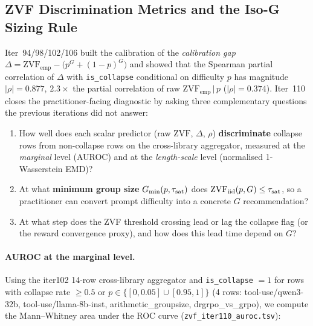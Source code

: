 
\subsection{ZVF Discrimination Metrics and the Iso-G Sizing Rule}
\label{sec:zvf-discrim}

Iter~94/98/102/106 built the calibration of the \emph{calibration gap}
$\Delta = \mathrm{ZVF}_{\mathrm{emp}} -
\bigl(p^{G}+(1-p)^{G}\bigr)$ and showed that the Spearman partial
correlation of $\Delta$ with \texttt{is\_collapse} conditional on
difficulty $p$ has magnitude $|\rho|=0.877$, $2.3\times$ the partial
correlation of raw $\mathrm{ZVF}_{\mathrm{emp}}\,|\,p$ ($|\rho|=0.374$).
Iter~110 closes the practitioner-facing diagnostic by asking three
complementary questions the previous iterations did not answer:

\begin{enumerate}
\item How well does each scalar predictor (raw $\mathrm{ZVF}$,
  $\Delta$, $\rho$) \textbf{discriminate} collapse rows from
  non-collapse rows on the cross-library aggregator, measured at the
  \emph{marginal} level (AUROC) and at the \emph{length-scale} level
  (normalised 1-Wasserstein EMD)?
\item At what \textbf{minimum group size} $G_{\min}(p,\tau_{\rm sat})$
  does $\mathrm{ZVF}_{\rm iid}(p,G)\leq\tau_{\rm sat}$, so a practitioner
  can convert prompt difficulty into a concrete $G$ recommendation?
\item At what step does the ZVF threshold crossing lead or lag the
  collapse flag (or the reward convergence proxy), and how does this
  lead time depend on $G$?
\end{enumerate}

\paragraph{AUROC at the marginal level.}
Using the iter102 14-row cross-library aggregator and
\texttt{is\_collapse} $=1$ for rows with collapse rate $\geq 0.5$ or
$p\!\in\!\{[0,0.05]\cup[0.95,1]\}$ (4 rows: tool-use/qwen3-32b,
tool-use/llama-8b-inst, arithmetic\_groupsize, drgrpo\_vs\_grpo), we
compute the Mann--Whitney area under the ROC curve (\texttt{zvf\_iter110\_auroc.tsv}):

